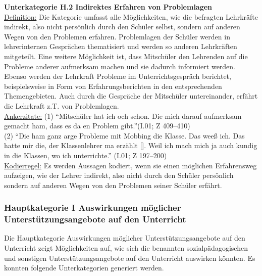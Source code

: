 \textbf{Unterkategorie H.2 Indirektes Erfahren von Problemlagen}\\
\underline{Definition:} Die Kategorie umfasst alle Möglichkeiten, wie die befragten Lehrkräfte indirekt, also nicht persönlich durch den Schüler selbst, sondern auf anderen Wegen von den Problemen erfahren. Problemlagen der Schüler werden in lehrerinternen Gesprächen thematisiert und werden so anderen Lehrkräften mitgeteilt. Eine weitere Möglichkeit ist, dass Mitschüler den Lehrenden auf die Probleme anderer aufmerksam machen und sie dadurch informiert werden. Ebenso werden der Lehrkraft Probleme im Unterrichtsgespräch berichtet, beispielsweise in Form von Erfahrungsberichten in den entsprechenden Themengebieten. Auch durch die Gespräche der Mitschüler untereinander, erfährt die Lehrkraft z.T. von Problemlagen.\\
\underline{Ankerzitate:} (1) "`Mitschüler hat ich och schon. Die mich darauf aufmerksam gemacht ham, dass es da en Problem gibt."'(I.01; Z 409--410)\\ (2) "`Die ham ganz arge Probleme mit Mobbing die Klasse. Das weeß ich. Das hatte mir die, der Klassenlehrer ma erzählt [\punkte]. Weil ich mach mich ja auch kundig in die Klassen, wo ich unterrichte."' (I.01; Z 197--200)\\
\underline{Kodierregel:} Es werden Aussagen kodiert, wenn sie einen möglichen Erfahrensweg aufzeigen, wie der Lehrer indirekt, also nicht durch den Schüler persönlich sondern auf anderen Wegen von den Problemen seiner Schüler erfährt.\\

\subsubsection{Hauptkategorie I Auswirkungen möglicher Unterstützungsangebote auf den Unterricht}
\label{sec:HauptkategorieIAuswirkungenMöglicherUnterstützungsangeboteAufDenUnterricht}

Die Hauptkategorie Auswirkungen möglicher Unterstützungsangebote auf den Unterricht zeigt Möglichkeiten auf, wie sich die benannten sozialpädagogischen und sonstigen Unterstützungsangebote auf den Unterricht auswirken könnten. Es konnten folgende Unterkategorien generiert werden.\\

